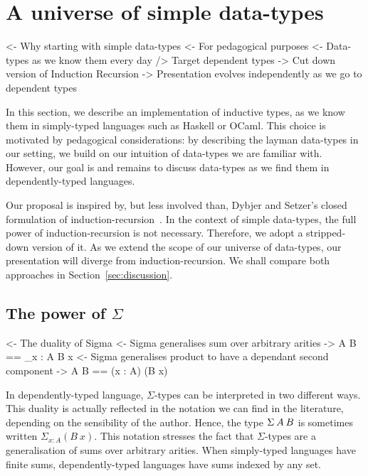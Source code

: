 \section{A universe of simple data-types}

\begin{wstructure}
<- Why starting with simple data-types
    <- For pedagogical purposes
        <- Data-types as we know them every day
        /> Target dependent types
    -> Cut down version of Induction Recursion
        -> Presentation evolves independently as we go to dependent types
\end{wstructure}

In this section, we describe an implementation of inductive types, as
we know them in simply-typed languages such as Haskell or OCaml. This
choice is motivated by pedagogical considerations: by describing the
layman data-types in our setting, we build on our intuition of
data-types we are familiar with. However, our goal is and remains to
discuss data-types as we find them in dependently-typed languages.

Our proposal is inspired by, but less involved than, Dybjer and
Setzer's closed formulation of
induction-recursion~\cite{dybjer:general-ir, dybjer:axiom-ir,
  dybjer:ir-initial-algebra, dybjer:iir}. In the context of simple
data-types, the full power of induction-recursion is not
necessary. Therefore, we adopt a stripped-down version of it. As we
extend the scope of our universe of data-types, our presentation will
diverge from induction-recursion. We shall compare both approaches in
Section~\ref{sec:discussion}.

\subsection{The power of $\Sigma$}

\begin{wstructure}
<- The duality of Sigma
    <- Sigma generalises sum over arbitrary arities
        -> \Sigma A B == \Sigma_{x : A} B x
    <- Sigma generalises product to have a dependant second component
        -> \Sigma A B == (x : A) \times (B x)
\end{wstructure}

In dependently-typed language, $\Sigma$-types can be interpreted in
two different ways. This duality is actually reflected in the notation
we can find in the literature, depending on the sensibility of the
author. Hence, the type $\SigmaTy{A}{B}$ is sometimes written
$\Sigma_{x : A} (B\: x)$. This notation stresses the fact that
$\Sigma$-types are a generalisation of sums over arbitrary
arities. When simply-typed languages have finite sums,
dependently-typed languages have sums indexed by any set.

